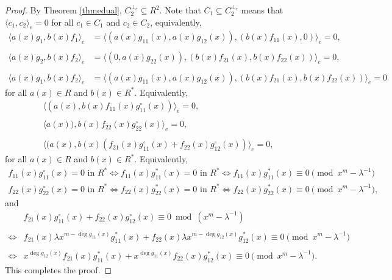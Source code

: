 \documentclass[12 pt]{extarticle}
\numberwithin{equation}{section}
\theoremstyle{definition}
\begin{document}
\begin{proof}
By Theorem \ref{thmedual}, $C_2^{\perp_e}\subseteq R^2$. 
Note that $C_1\subseteq C_2^{\perp_e}$ means that $\langle c_1,c_2\rangle_e=0$ for all $c_1\in C_1$ and $c_2\in C_2$, equivalently,
\begin{equation*}
    \begin{split}
        \langle a(x)g_1,b(x)f_1\rangle_e&=\langle (a(x)g_{11}(x),a(x)g_{12}(x)),(b(x)f_{11}(x),0)\rangle_e=0,\\\\
        \langle a(x)g_2, b(x)f_2\rangle_e&=\langle (0,a(x)g_{22}(x)),(b(x)f_{21}(x),b(x)f_{22}(x)) \rangle_e=0,\\\\
        \langle a(x)g_1, b(x)f_2\rangle_e&=\langle (a(x)g_{11}(x),a(x)g_{12}(x)),(b(x)f_{21}(x),b(x)f_{22}(x)) \rangle_e=0
    \end{split}
\end{equation*}
for all $a(x)\in R$ and $b(x)\in R^*$. Equivalently,
\begin{equation*}
    \begin{split}
        \langle (a(x), b(x)f_{11}(x)g^{\circ}_{11}(x)) \rangle_e=0,\\\\
        \langle a(x)),b(x)f_{22}(x)g^{\circ}_{22}(x) \rangle_e=0,\\\\
         \langle (a(x),b(x)(f_{21}(x)g^{\circ}_{11}(x)+f_{22}(x)g^{\circ}_{12}(x))\rangle_e=0,
    \end{split}
\end{equation*}
for all $a(x)\in R$ and $b(x)\in R^*$.
Equivalently, 
\begin{equation*}
    \begin{split}
        f_{11}(x)g^{\circ}_{11}(x)=0  \text{ in } R^* \iff  f_{11}(x)g^*_{11}(x)=0 \text{ in } R^* \iff  f_{11}(x)g^*_{11}(x)\equiv 0 \pmod{x^m-\lambda^{-1}}\\
        f_{22}(x)g^{\circ}_{22}(x)=0 \text{ in } R^* \iff f_{22}(x)g^*_{22}(x)=0 \text{ in } R^* \iff  f_{22}(x)g_{22}^*(x)\equiv 0 \pmod{x^m-\lambda^{-1}},
    \end{split}
\end{equation*}
and 
\begin{equation*}
    \begin{split}
       &f_{21}(x)g^{\circ}_{11}(x)+f_{22}(x)g^{\circ}_{12}(x)\equiv 0 \bmod(x^m-\lambda^{-1}) \\
       \\
      \iff & f_{21}(x)\lambda x^{m-\deg g_{11}(x)}g^*_{11}(x)     +f_{22}(x)\lambda x^{m-\deg g_{12}(x)}g^*_{12}(x)\equiv 0\pmod{x^m-\lambda^{-1}}\\
       \\
     \iff & x^{\deg g_{12}(x)}f_{21}(x) g^*_{11}(x)     +x^{\deg g_{11}(x)}f_{22}(x) g^*_{12}(x)\equiv 0\pmod{x^m-\lambda^{-1}}. 
    \end{split}
\end{equation*}
This completes the proof.
\end{proof}
\end{document}
